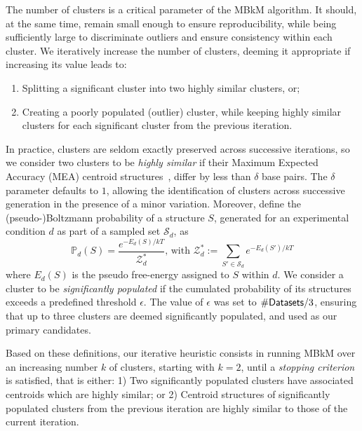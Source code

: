 \documentclass[a4,center,fleqn]{NAR}
\newcommand{\CL}{MBkM\xspace}
\newcommand{\NumClust}{k}
\newcommand{\Def}[1]{{\em #1}}
\begin{document}
The number of clusters is a critical parameter of the \CL{} algorithm. It should, at the same time, remain small enough to ensure reproducibility, while being sufficiently large to discriminate outliers and ensure consistency within each cluster. We iteratively increase the number of clusters, deeming it appropriate if increasing its value leads to:
\begin{enumerate} 
	\item Splitting a significant cluster into two highly similar clusters, or; 
	\item Creating a poorly populated (outlier) cluster, while keeping highly similar clusters for each significant cluster from the previous iteration.
\end{enumerate} 
In practice, clusters are seldom exactly preserved across successive iterations, so we consider two clusters to be \Def{highly similar} if their Maximum Expected Accuracy (MEA) centroid structures~\citep{Lu2009}, differ by less than $\delta$ base pairs.
The $\delta$ parameter defaults to $1$, allowing the identification of clusters across successive generation in the presence of a minor variation.
Moreover, define the (pseudo-)Boltzmann probability of a structure $S$, generated for an experimental condition $d$ as part of a sampled set $\mathcal{S}_d$, as
$$ \mathbb{P}_d(S) = \frac{e^{-E_d(S)/kT}}{\mathcal{Z}^*_d} \text{, with } \mathcal{Z}^*_d := \sum_{S'\in \mathcal{S}_d} e^{-E_d(S')/kT}$$
where $E_d(S)$ is the pseudo free-energy assigned to $S$ within $d$.
We consider a cluster to be \Def{significantly populated} if the cumulated probability of its structures exceeds a predefined threshold $\epsilon$. 
The value of $\epsilon$ was set to $\#{\sf Datasets}/3$, ensuring that up to three clusters are deemed significantly populated, and used as our primary candidates.

Based on these definitions, our iterative heuristic consists in running \CL over an increasing number $\NumClust$ of clusters, starting with $\NumClust=2$, until a \Def{stopping criterion} is satisfied, that is either: 1) Two significantly populated clusters have associated centroids which are highly similar; or 2) Centroid structures of significantly populated clusters from the previous iteration are highly similar to those of the current iteration.
\end{document}
